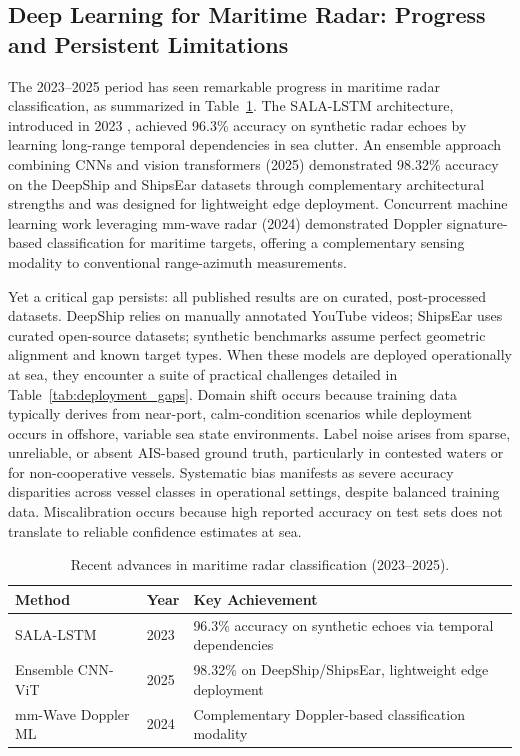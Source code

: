 \documentclass[conf]{asmeconf}
\begin{document}
\subsection{Deep Learning for Maritime Radar: Progress and Persistent Limitations}

The 2023--2025 period has seen remarkable progress in maritime radar classification, as summarized in Table~\ref{tab:radar_progress}. The SALA-LSTM architecture, introduced in 2023 \cite{Wang2023SALALSTM}, achieved 96.3\% accuracy on synthetic radar echoes by learning long-range temporal dependencies in sea clutter. An ensemble approach combining CNNs and vision transformers (2025) \cite{Cao2025VesselCNN} demonstrated 98.32\% accuracy on the DeepShip and ShipsEar datasets through complementary architectural strengths and was designed for lightweight edge deployment. Concurrent machine learning work leveraging mm-wave radar (2024) \cite{Rahman2024RadarClassification} demonstrated Doppler signature-based classification for maritime targets, offering a complementary sensing modality to conventional range-azimuth measurements.

Yet a critical gap persists: all published results are on curated, post-processed datasets. DeepShip relies on manually annotated YouTube videos; ShipsEar uses curated open-source datasets; synthetic benchmarks assume perfect geometric alignment and known target types. When these models are deployed operationally at sea, they encounter a suite of practical challenges detailed in Table~\ref{tab:deployment_gaps}. Domain shift occurs because training data typically derives from near-port, calm-condition scenarios while deployment occurs in offshore, variable sea state environments. Label noise arises from sparse, unreliable, or absent AIS-based ground truth, particularly in contested waters or for non-cooperative vessels. Systematic bias manifests as severe accuracy disparities across vessel classes in operational settings, despite balanced training data. Miscalibration occurs because high reported accuracy on test sets does not translate to reliable confidence estimates at sea.

\begin{table}[t]
\caption{Recent advances in maritime radar classification (2023--2025).}
\label{tab:radar_progress}
\centering
\small
\begin{tabular}{@{}llp{4cm}@{}}
\toprule
Method & Year & Key Achievement \\
\midrule
SALA-LSTM & 2023 & 96.3\% accuracy on synthetic echoes via temporal dependencies \\
\midrule
Ensemble CNN-ViT & 2025 & 98.32\% on DeepShip/ShipsEar, lightweight edge deployment \\
\midrule
mm-Wave Doppler ML & 2024 & Complementary Doppler-based classification modality \\
\bottomrule
\end{tabular}
\end{table}
\end{document}
